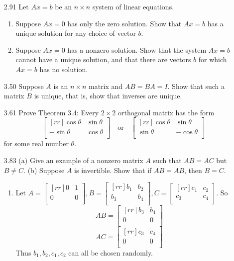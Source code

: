 \documentclass[12pt]{article}
\theoremstyle{plain}
\theoremstyle{definition}
\theoremstyle{plain}
\begin{document}
\begin{enumerate}
\item[2.91]Let $Ax=b$ be an $n \times n$ system of linear equations.
	\begin{enumerate}
	\item Suppose $Ax=0$ has only the zero solution. Show that $Ax=b$ has a unique solution for any choice of vector $b$.
	\item Suppose $Ax=0$ has a nonzero solution. Show that the system $Ax=b$ cannot have a unique solution, and that there are vectors $b$ for which $Ax=b$ has no solution.
	\end{enumerate}		
	
\item[3.50]Suppose $A$ is an $n \times n$ matrix and $AB=BA=I$. Show that such a matrix $B$ is unique, that is, show that inverses are unique.

\item[3.61]Prove Theorem 3.4: Every $2 \times 2$ orthogonal matrix has the form
\[ \begin{bmatrix}[rr]\cos\theta & \sin\theta\\-\sin\theta & \cos\theta\\\end{bmatrix} \quad \mathrm{or} \quad \begin{bmatrix}[rr]\cos\theta & \sin\theta\\\sin\theta & -\cos\theta \\\end{bmatrix} \]
for some real number $\theta$.

\item[3.83](a) Give an example of a nonzero matrix $A$ such that $AB=AC$ but $B\neq C$. (b) Suppose $A$ is invertible. Show that if $AB=AB$, then $B=C$.
	\begin{enumerate}
	\item Let $A=\begin{bmatrix}[rr]0&1\\0&0\\\end{bmatrix},B=\begin{bmatrix}[rr]b_1&b_2\\b_3&b_4\\\end{bmatrix},C=\begin{bmatrix}[rr]c_1&c_2\\c_3&c_4\\\end{bmatrix}$. So
	\[ AB = \begin{bmatrix}[rr]b_3&b_4\\0&0\\\end{bmatrix} \]
	\[ AC = \begin{bmatrix}[rr]c_3&c_4\\0&0\\\end{bmatrix} \]
	Thus $b_1,b_2,c_1,c_2$ can all be chosen randomly.
	\end{enumerate}
	

\end{enumerate}
\end{document}
